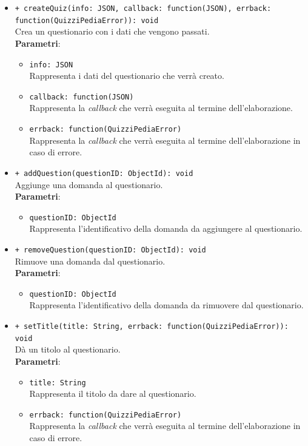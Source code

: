 \begin{itemize}
\begin{itemize}
			\item \texttt{+ createQuiz(info: JSON, callback: function(JSON), errback: function(QuizziPediaError)): void}\\
			Crea un questionario con i dati che vengono passati.\\
			\textbf{Parametri}:
			\begin{itemize}
				\item \texttt{info: JSON}\\
				Rappresenta i dati del questionario che verrà creato.
				\item \texttt{callback: function(JSON)}\\
				Rappresenta la \textit{callback} che verrà eseguita al termine dell'elaborazione.
				\item \texttt{errback: function(QuizziPediaError)}\\
				Rappresenta la \textit{callback} che verrà eseguita al termine dell'elaborazione in caso di errore.
			\end{itemize}
			
			\item \texttt{+ addQuestion(questionID: ObjectId): void}\\
			Aggiunge una domanda al questionario.\\
			\textbf{Parametri}:
			\begin{itemize}
				\item \texttt{questionID: ObjectId}\\
				Rappresenta l'identificativo della domanda da aggiungere al questionario.
			\end{itemize}
			
			\item \texttt{+ removeQuestion(questionID: ObjectId): void}\\
			Rimuove una domanda dal questionario.\\
			\textbf{Parametri}:
			\begin{itemize}
				\item \texttt{questionID: ObjectId}\\
				Rappresenta l'identificativo della domanda da rimuovere dal questionario.
			\end{itemize}
			
			\item \texttt{+ setTitle(title: String, errback: function(QuizziPediaError)): void}\\ 		
			Dà un titolo al questionario.\\
			\textbf{Parametri}:
			\begin{itemize}
				\item \texttt{title: String}\\
				Rappresenta il titolo da dare al questionario.
				\item \texttt{errback: function(QuizziPediaError)}\\
				Rappresenta la \textit{callback} che verrà eseguita al termine dell'elaborazione in caso di errore.
			\end{itemize}
			

\end{itemize}
\end{itemize}
